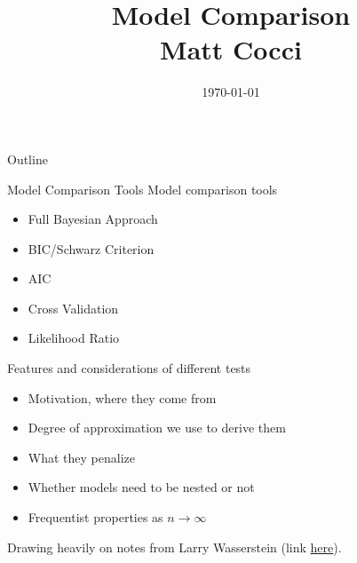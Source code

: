 \documentclass[aspectratio=169, handout]{beamer}
\title[]{Model Comparison \\ Matt Cocci}
\author[]{}
\date{\today}
\newcommand{\ra}{\rightarrow}
\begin{document}
\begin{frame}[plain]
\titlepage
\end{frame}


\begin{frame}{Outline}
\tableofcontents
\end{frame}




{\scriptsize
\begin{frame}{Model Comparison Tools}
Model comparison tools
\begin{itemize}
  \item Full Bayesian Approach
  \item BIC/Schwarz Criterion
  \item AIC
  \item Cross Validation
  \item Likelihood Ratio
\end{itemize}
Features and considerations of different tests
\begin{itemize}
  \item Motivation, where they come from
  \item Degree of approximation we use to derive them
  \item What they penalize
  \item Whether models need to be nested or not
  \item Frequentist properties as $n\ra\infty$
\end{itemize}
Drawing heavily on notes from Larry Wasserstein (link
\href{http://stat.cmu.edu/~larry/=stat705/Lecture16.pdf}{here}).
\end{frame}
}
\end{document}
